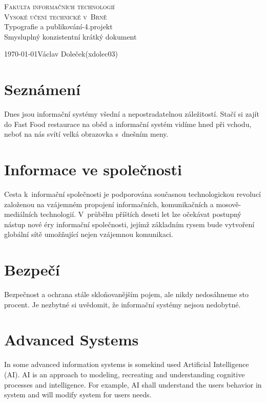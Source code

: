 \documentclass[czech,a4paper,11pt]{article}
\begin{document}
\begin{titlepage}
\begin{center}

    \huge
    \textsc{Fakulta informačních technologií}\\
    \textsc{Vysoké učení technické v~Brně}\\
    Typografie a publikování-4.projekt\\
    Smysluplný konzistentní krátký dokument
\end{center}
{\large \today \hfill Václav Doleček(xdolec03)}

\end{titlepage}

\newpage

\section{Seznámení}
Dnes jsou informační systémy všední a nepostradatelnou záležitostí. Stačí si zajít do Fast Food restaurace na oběd
a informační systém vidíme hned při vchodu, neboť na nás svítí velká obrazovka s~dnešním meny.\cite{HorakMartin}
\\

\section{Informace ve společnosti}
Cesta k~informační společnosti je podporována současnou technologickou revolucí založenou na vzájemném propojení informačních, komunikačních a mosově-mediálních technologií. V~průběhu příštích deseti let lze očekávat postupný nástup nové éry informační společnosti, jejímž základním rysem bude vytvoření globální sítě umožňující nejen vzájemnou komunikaci.\cite{HrabanVaclav}
\\
\section{Bezpečí}
Bezpečnost a ochrana stále skloňovanějším pojem, ale nikdy nedosáhneme sto procent. Je nezbytné si uvědomit, že
informační systémy nejsou nedobytné.\cite{KucharKarel} 
\\

\section{Advanced Systems}
In some advanced information systems is somekind used Artificial Intelligence (AI). AI is an approach to modeling,
recreating and understanding cognitive processes and intelligence. For example, AI shall understand the users
behavior in system and will modify system for users needs.\cite{RagasLudek}



\newpage





\end{document}
